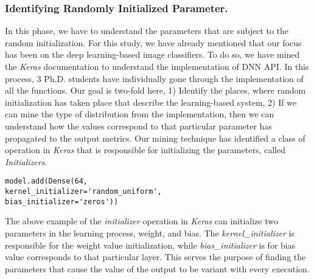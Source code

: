 \subsubsection{Identifying Randomly Initialized Parameter.}
In this phase, we have to understand the parameters that are subject to the random initialization. For this study, we have already mentioned that our focus has been on the deep learning-based image classifiers. To do so, we have mined the \emph{Keras} documentation to understand the implementation of DNN API. In this process, 3 Ph.D. students have individually gone through the implementation of all the functions. Our goal is two-fold here, 1) Identify the places, where random initialization has taken place that describe the learning-based system, 2) If we can mine the type of distribution from the implementation, then we can understand how the values correspond to that particular parameter has propagated to the output metrics. Our mining technique has identified a class of operation in \emph{Keras} that is responsible for initializing the parameters, called \emph{Initializers.} 
\begin{lstlisting}
model.add(Dense(64,
kernel_initializer='random_uniform',
bias_initializer='zeros'))
\end{lstlisting}
The above example of the \emph{initializer} operation in \emph{Keras} can initialize two parameters in the learning process, weight, and bias. The \emph{kernel\_initializer} is responsible for the weight value initialization, while \emph{bias\_initializer} is for bias value corresponds to that particular layer. This serves the purpose of finding the parameters that cause the value of the output to be variant with every execution. 

